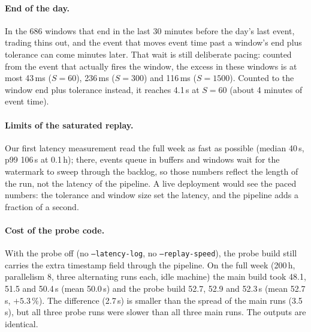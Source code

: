 \paragraph{End of the day.} In the 686 windows that end in the last 30 minutes
before the day's last event, trading thins out, and the event that moves event
time past a window's end plus tolerance can come minutes later. That wait is
still deliberate pacing: counted from the event that actually fires the window,
the excess in these windows is at most 43\,ms ($S{=}60$), 236\,ms ($S{=}300$)
and 116\,ms ($S{=}1500$). Counted to the window end plus tolerance instead, it
reaches 4.1\,s at $S{=}60$ (about 4 minutes of event time).

\paragraph{Limits of the saturated replay.} Our first latency measurement read
the full week as fast as possible (median 40\,s, p99 106\,s at 0.1\,h); there,
events queue in buffers and windows wait for the watermark to sweep through the
backlog, so those numbers reflect the length of the run, not the latency of the
pipeline. A live deployment would see the paced numbers: the tolerance and
window size set the latency, and the pipeline adds a fraction of a second.

\paragraph{Cost of the probe code.} With the probe off (no
\texttt{--latency-log}, no \texttt{--replay-speed}), the probe build still
carries the extra timestamp field through the pipeline. On the full week
(200\,h, parallelism 8, three alternating runs each, idle machine) the main
build took 48.1, 51.5 and 50.4\,s (mean 50.0\,s) and the probe build 52.7,
52.9 and 52.3\,s (mean 52.7\,s, $+5.3\,\%$). The difference (2.7\,s) is smaller
than the spread of the main runs (3.5\,s), but all three probe runs were slower
than all three main runs. The outputs are identical.
